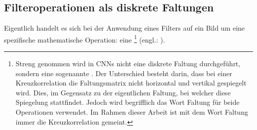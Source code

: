 \subsection{Filteroperationen als diskrete Faltungen}\label{sec:filteroperation_mathematisch}
Eigentlich handelt es sich bei der Anwendung eines Filters auf ein Bild um
eine spezifische mathematische Operation: eine %
\footnote{
  Streng genommen wird in CNNs nicht eine diskrete Faltung durchgeführt, sondern
  eine sogenannte . Der Unterschied besteht darin, dass bei einer
  Kreuzkorrelation die Faltungsmatrix nicht horizontal und vertikal
  gespiegelt wird. Dies, im Gegensatz zu der eigentlichen Faltung, bei welcher
  diese Spiegelung stattfindet. Jedoch wird
  begrifflich das Wort Faltung für beide Operationen verwendet. Im Rahmen dieser
  Arbeit ist mit dem Wort Faltung immer die Kreuzkorrelation gemeint.
} (engl.: ).

